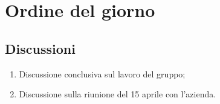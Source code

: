 \section{Ordine del giorno} \label{sec:agenda}
\subsection{Discussioni} \label{subsec:discussione}
\begin{enumerate}
    \item Discussione conclusiva sul lavoro del gruppo;
    \item Discussione sulla riunione del 15 aprile con l'azienda.
\end{enumerate}

